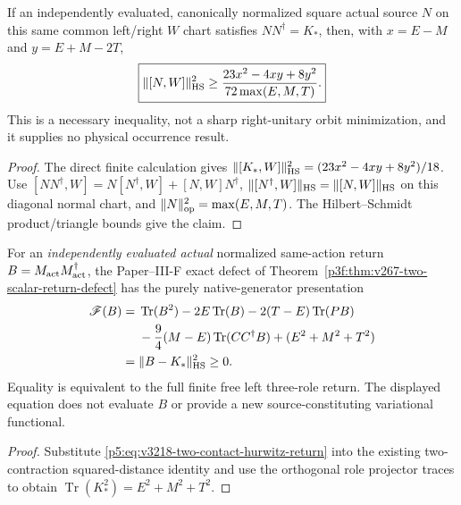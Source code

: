 \documentclass[12pt,a4paper]{article}
\begin{document}
\begin{corollary}
\label{p5:cor:v3218-source-commutator-threshold}
If an independently evaluated, canonically normalized square actual
source $N$ on this same common left/right $W$ chart satisfies
$NN^\dagger=K_*$, then, with $x=E-M$ and $y=E+M-2T$,
\[
 \boxed{\|[N,W]\|_{\rm HS}^2\ge
 \frac{23x^2-4xy+8y^2}{72\max(E,M,T)}.}
\]
This is a necessary inequality, not a sharp right-unitary orbit
minimization, and it supplies no physical occurrence result.
\end{corollary}
\begin{proof}
The direct finite calculation gives
$\|[K_*,W]\|_{\rm HS}^2=(23x^2-4xy+8y^2)/18$.
Use $[NN^\dagger,W]=N[N^\dagger,W]+[N,W]N^\dagger$,
$\|[N^\dagger,W]\|_{\rm HS}=\|[N,W]\|_{\rm HS}$
on this diagonal normal chart, and
$\|N\|_{\rm op}^2=\max(E,M,T)$.
The Hilbert--Schmidt product/triangle bounds give the claim.
\end{proof}

\begin{corollary}
\label{p5:cor:v3218-native-action-defect}
For an \emph{independently evaluated actual} normalized same-action
return $B=M_{\rm act}M_{\rm act}^\dagger$, the Paper--III-F exact defect of
Theorem~\ref{p3f:thm:v267-two-scalar-return-defect} has the purely
native-generator presentation
\begin{align*}
 \mathscr F(B)={}&\operatorname{Tr}(B^2)-2E\operatorname{Tr}(B)
 -2(T-E)\operatorname{Tr}(PB)\\
 &-\frac94(M-E)\operatorname{Tr}(CC^\dagger B)
 +(E^2+M^2+T^2)\\
 ={}&\|B-K_*\|_{\rm HS}^2\ge0.
\end{align*}
Equality is equivalent to the full finite free left three-role return.
The displayed equation does not evaluate $B$ or provide a new
source-constituting variational functional.
\end{corollary}
\begin{proof}
Substitute \eqref{p5:eq:v3218-two-contact-hurwitz-return} into the
existing two-contraction squared-distance identity and use the
orthogonal role projector traces to obtain
$\operatorname{Tr}(K_*^2)=E^2+M^2+T^2$.
\end{proof}
\end{document}
